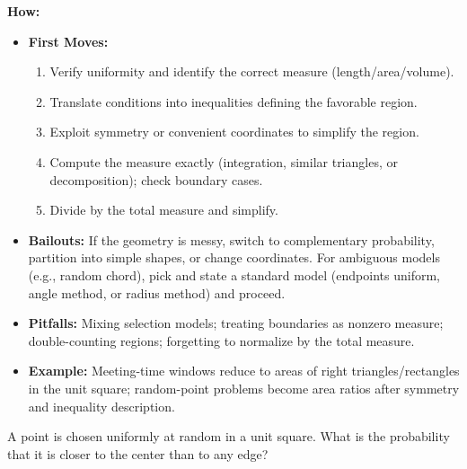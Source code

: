 \documentclass[12pt]{article}
\newenvironment{problem}[1]
{\begin{tcolorbox}[colback=blue!5!white,colframe=blue!75!black,title={#1}]}{\end{tcolorbox}}
\begin{document}
\textbf{How:}
\begin{itemize}
    \item \textbf{First Moves:}
    \begin{enumerate}[nosep]
        \item Verify uniformity and identify the correct measure (length/area/volume).
        \item Translate conditions into inequalities defining the favorable region.
        \item Exploit symmetry or convenient coordinates to simplify the region.
        \item Compute the measure exactly (integration, similar triangles, or decomposition); check boundary cases.
        \item Divide by the total measure and simplify.
    \end{enumerate}
    \item \textbf{Bailouts:} If the geometry is messy, switch to complementary probability, partition into simple shapes, or change coordinates. For ambiguous models (e.g., random chord), pick and state a standard model (endpoints uniform, angle method, or radius method) and proceed.
    \item \textbf{Pitfalls:} Mixing selection models; treating boundaries as nonzero measure; double-counting regions; forgetting to normalize by the total measure.
    \item \textbf{Example:} Meeting-time windows reduce to areas of right triangles/rectangles in the unit square; random-point problems become area ratios after symmetry and inequality description.
\end{itemize}

\begin{problem}{Example: Random Point in Square}
A point is chosen uniformly at random in a unit square. What is the probability that it is closer to the center than to any edge?
\end{problem}
\end{document}
